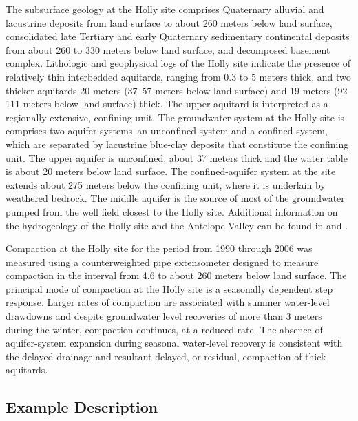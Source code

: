 The subsurface geology at the Holly site comprises Quaternary alluvial and lacustrine deposits from land surface to about 260 meters below land surface, consolidated late Tertiary and early Quaternary sedimentary continental deposits from about 260 to 330 meters below land surface, and decomposed basement complex. Lithologic and geophysical logs of the Holly site indicate the presence of relatively thin interbedded aquitards, ranging from 0.3 to 5 meters thick, and two thicker aquitards 20 meters (37--57 meters below land surface) and 19 meters (92--111 meters below land surface) thick. The upper aquitard is interpreted as a regionally extensive, confining unit. The groundwater system at the Holly site is comprises two aquifer systems--an unconfined system and a confined system, which are separated by lacustrine blue-clay deposits that constitute the confining unit. The upper aquifer is unconfined, about 37 meters thick and the water table is about 20 meters below land surface. The confined-aquifer system at the site extends about 275 meters below the confining unit, where it is underlain by weathered bedrock. The middle aquifer is the source of most of the groundwater pumped from the well field closest to the Holly site. Additional information on the hydrogeology of the Holly site and the Antelope Valley can be found in \cite{sneed2000aquifer} and  \cite{sneed2008}.

Compaction at the Holly site for the period from 1990 through 2006 was measured using a counterweighted pipe extensometer designed to measure compaction in the interval from 4.6 to about 260 meters below land surface. The principal mode of compaction at the Holly site is a seasonally dependent step response. Larger rates of compaction are associated with summer water-level drawdowns and despite groundwater level recoveries of more than 3 meters during the winter, compaction continues, at a reduced rate. The absence of aquifer-system expansion during seasonal water-level recovery is consistent with the delayed drainage and resultant delayed, or residual, compaction of thick aquitards.

\subsection{Example Description}

